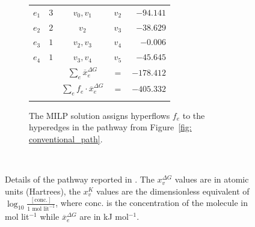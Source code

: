 \begin{figure}[!t]
\begin{subfigure}{\textwidth}
\begin{footnotesize}
\begin{tabular}{ccccr}
		    \midrule
		    $e_1$ & $3$ & $v_0, v_1$ & $v_2$ & $-94.141$ \\
		    $e_2$ & $2$ & $v_2$ & $v_3$ & $-38.629$ \\
		    $e_3$ & $1$ & $v_2, v_3$ & $v_4$ & $-0.006$ \\
		    $e_4$ & $1$ & $v_3, v_4$ & $v_5$ & $-45.645$ \\
		    \midrule
		    & & $\sum_e \overline{x}^{\Delta G}_e$ & $=$ & $-178.412$ \\
		    & & $\sum_e f_e\cdot \overline{x}^{\Delta G}_e$ & $=$ & $-405.332$ \\
		    \bottomrule\\
		\end{tabular}
		\end{footnotesize}
		\caption{The MILP solution assigns hyperflows $f_e$ to the hyperedges in the pathway from Figure~\ref{fig: conventional_path}.}
		\label{tab:convSoln_reactions}
    \end{subfigure}\\
    \vspace{0.5cm}
    \caption{Details of the pathway reported in \cite{implemented_CRN}. The $x_v^{\Delta G}$ values are in atomic units (Hartrees), the $x_v^K$ values are the dimensionless equivalent of $\log_{10} \frac{[\text{conc.}]}{1 \text{ mol lit}^{-1}}$, where conc. is the concentration of the molecule in mol lit$^{-1}$ while $\overline{x}^{\Delta G}_e$ are in kJ mol$^{-1}$.}
\end{figure}


